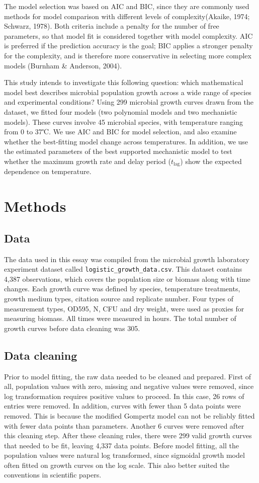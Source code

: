 \documentclass[11pt]{article}
\begin{document}
The model selection was based on AIC and BIC, since they are commonly used methods for model comparison with different levels of complexity(Akaike, 1974; Schwarz, 1978). Both criteria include a penalty for the number of free parameters, so that model fit is considered together with model complexity. AIC is preferred if the prediction accuracy is the goal; BIC applies a stronger penalty for the complexity, and is therefore more conservative in selecting more complex models (Burnham \& Anderson, 2004).

This study intends to investigate this following question: which mathematical model best describes microbial population growth across a wide range of species and experimental conditions? Using 299 microbial growth curves drawn from the dataset, we fitted four models (two polynomial models and two mechanistic models). These curves involve 45 microbial species, with temperature ranging from 0 to 37℃. We use AIC and BIC for model selection, and also examine whether the best-fitting model change across temperatures. In addition, we use the estimated parameters of the best supported mechanistic model to test whether the maximum growth rate and delay period (\(t_{\mathrm{lag}}\)) show the expected dependence on temperature.

\section{Methods}

\subsection{Data}
The data used in this essay was compiled from the microbial growth laboratory experiment dataset called \texttt{logistic\_growth\_data.csv}. This dataset contains 4,387 observations, which covers the population size or biomass along with time changes. Each growth curve was defined by species, temperature treatments, growth medium types, citation source and replicate number. Four types of measurement types, OD595, N, CFU and dry weight, were used as proxies for measuring biomass.  All times were measured in hours. The total number of growth curves before data cleaning was 305.
\subsection{Data cleaning}
Prior to model fitting, the raw data needed to be cleaned and prepared. First of all, population values with zero, missing and negative values were removed, since log transformation requires positive values to proceed. In this case, 26 rows of entries were removed. In addition, curves with fewer than 5 data points were removed. This is because the modified Gompertz model can not be reliably fitted with fewer data points than parameters. Another 6 curves were removed after this cleaning step. After these cleaning rules, there were 299 valid growth curves that needed to be fit, leaving 4,337 data points. Before model fitting, all the population values were natural log transformed, since sigmoidal growth model often fitted on growth curves on the log scale. This also better suited the conventions in scientific papers.
\end{document}
